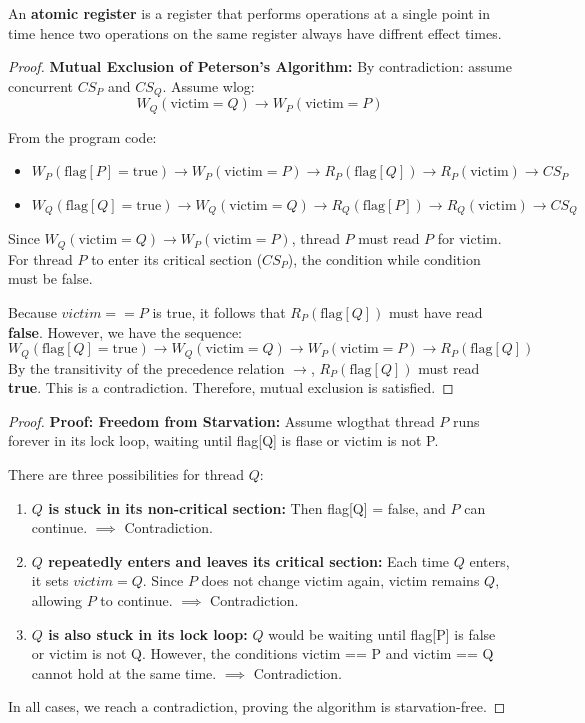 \begin{definition}
    An \textbf{atomic register} is a register that performs operations at a single point in time hence two operations on the same register always have diffrent effect times.
\end{definition}

\begin{proof}
    \textbf{Mutual Exclusion of Peterson's Algorithm:} By contradiction: assume concurrent $CS_P$ and $CS_Q$. Assume wlog: 
    $$W_Q(\text{victim}=Q) \rightarrow W_P(\text{victim}=P)$$

    From the program code:
    \begin{itemize}
        \item $W_P(\text{flag}[P]=\text{true}) \rightarrow W_P(\text{victim}=P) \rightarrow R_P(\text{flag}[Q]) \rightarrow R_P(\text{victim}) \rightarrow CS_P$
        \item $W_Q(\text{flag}[Q]=\text{true}) \rightarrow W_Q(\text{victim}=Q) \rightarrow R_Q(\text{flag}[P]) \rightarrow R_Q(\text{victim}) \rightarrow CS_Q$
    \end{itemize}

    Since $W_Q(\text{victim}=Q) \rightarrow W_P(\text{victim}=P)$, thread $P$ must read $P$ for victim.
    For thread $P$ to enter its critical section ($CS_P$), the condition while condition must be false.

    Because $victim == P$ is true, it follows that $R_P(\text{flag}[Q])$ must have read \textbf{false}.
    However, we have the sequence: 
    $$W_Q(\text{flag}[Q]=\text{true}) \rightarrow W_Q(\text{victim}=Q) \rightarrow W_P(\text{victim}=P) \rightarrow R_P(\text{flag}[Q])$$
    By the transitivity of the precedence relation $\rightarrow$, $R_P(\text{flag}[Q])$ must read \textbf{true}.
    This is a contradiction. Therefore, mutual exclusion is satisfied.
\end{proof}

\begin{proof}
\textbf{Proof: Freedom from Starvation:} Assume wlogthat thread $P$ runs forever in its lock loop, waiting until flag[Q] is flase or victim is not P.

There are three possibilities for thread $Q$:
\begin{enumerate}
    \item \textbf{$Q$ is stuck in its non-critical section:} 
    Then flag[Q] = false, and $P$ can continue. $\implies$ Contradiction.
    
    \item \textbf{$Q$ repeatedly enters and leaves its critical section:} 
    Each time $Q$ enters, it sets $victim = Q$. Since $P$ does not change victim again, victim remains $Q$, allowing $P$ to continue. $\implies$ Contradiction.
    
    \item \textbf{$Q$ is also stuck in its lock loop:} 
    $Q$ would be waiting until flag[P] is false or victim is not Q. However, the conditions victim == P and victim == Q cannot hold at the same time. $\implies$ Contradiction.
\end{enumerate}
In all cases, we reach a contradiction, proving the algorithm is starvation-free.
\end{proof}

